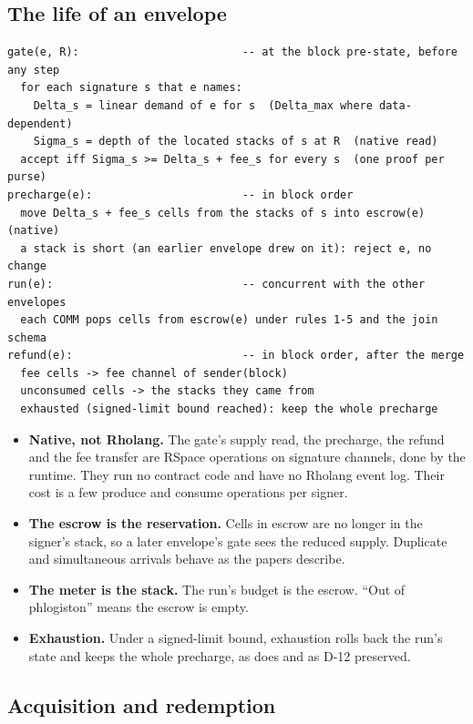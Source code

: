 \documentclass[11pt]{article}
\newcommand{\code}{\path}
\begin{document}
\subsection{The life of an envelope}

\begin{Verbatim}[fontsize=\footnotesize,frame=single,framesep=6pt]
gate(e, R):                         -- at the block pre-state, before any step
  for each signature s that e names:
    Delta_s = linear demand of e for s  (Delta_max where data-dependent)
    Sigma_s = depth of the located stacks of s at R  (native read)
  accept iff Sigma_s >= Delta_s + fee_s for every s  (one proof per purse)
precharge(e):                       -- in block order
  move Delta_s + fee_s cells from the stacks of s into escrow(e)  (native)
  a stack is short (an earlier envelope drew on it): reject e, no change
run(e):                             -- concurrent with the other envelopes
  each COMM pops cells from escrow(e) under rules 1-5 and the join schema
refund(e):                          -- in block order, after the merge
  fee cells -> fee channel of sender(block)
  unconsumed cells -> the stacks they came from
  exhausted (signed-limit bound reached): keep the whole precharge
\end{Verbatim}

\begin{itemize}
\item \textbf{Native, not Rholang.} The gate's supply read, the precharge, the refund and the fee transfer are RSpace operations on signature channels, done by the runtime. They run no contract code and have no Rholang event log. Their cost is a few produce and consume operations per signer.
\item \textbf{The escrow is the reservation.} Cells in escrow are no longer in the signer's stack, so a later envelope's gate sees the reduced supply. Duplicate and simultaneous arrivals behave as the papers describe.
\item \textbf{The meter is the stack.} The run's budget is the escrow. ``Out of phlogiston'' means the escrow is empty.
\item \textbf{Exhaustion.} Under a signed-limit bound, exhaustion rolls back the run's state and keeps the whole precharge, as \code{dev} does and as D-12 preserved.
\end{itemize}

\subsection{Acquisition and redemption}
\end{document}
